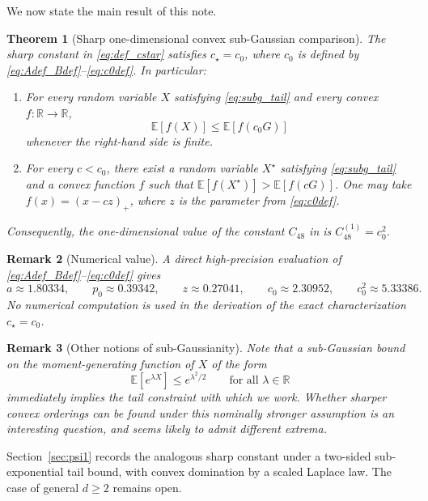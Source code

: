 \documentclass[11pt]{article}
\newcommand{\R}{\mathbb{R}}
\newcommand{\Ebb}{\mathbb{E}}
\newtheorem{theorem}{Theorem}
\newtheorem{remark}[theorem]{Remark}
\begin{document}
We now state the main result of this note.
\begin{theorem}[Sharp one-dimensional convex sub-Gaussian comparison]
\label{thm:main}
The sharp constant in \eqref{eq:def_cstar} satisfies $c_\star = c_0$, where $c_0$ is defined by \eqref{eq:Adef_Bdef}--\eqref{eq:c0def}. In particular:
\begin{enumerate}
\item For every random variable $X$ satisfying \eqref{eq:subg_tail} and every convex $f:\R\to\R$,
%
\begin{equation}
\label{eq:main_conv_dom}
\Ebb[f(X)] \le \Ebb[f(c_0G)]
\end{equation}
%
whenever the right-hand side is finite.
\item For every $c<c_0$, there exist a random variable $X^\star$ satisfying \eqref{eq:subg_tail} and a convex
function $f$ such that $\Ebb[f(X^\star)] > \Ebb[f(cG)]$.
One may take $f(x) = (x-cz)_+$, where $z$ is the parameter from \eqref{eq:c0def}.
\end{enumerate}
Consequently, the one-dimensional value of the constant $C_{48}$ in \cite{optimization-constants-repo} is $C_{48}^{(1)} = c_0^2$.
\end{theorem}

\begin{remark}[Numerical value]
A direct high-precision evaluation of \eqref{eq:Adef_Bdef}--\eqref{eq:c0def} gives
%
\[
a \approx 1.80334,\qquad
p_0 \approx 0.39342,\qquad
z \approx 0.27041,\qquad
c_0 \approx 2.30952,\qquad
c_0^2 \approx 5.33386.
\]
%
No numerical computation is used in the derivation of the exact characterization $c_\star=c_0$.
\end{remark}

\begin{remark}[Other notions of sub-Gaussianity]
    Note that a sub-Gaussian bound on the moment-generating function of $X$ of the form
    \begin{equation*}
        \mathbb{E} [ e^{\lambda X}] \leq e^{\lambda^2 / 2} \qquad \text{for all } \lambda \in \mathbb{R}
    \end{equation*}
    immediately implies the tail constraint with which we work. Whether sharper convex orderings can be found under this nominally stronger assumption is an interesting question, and seems likely to admit different extrema.
\end{remark}

Section~\ref{sec:psi1} records the analogous sharp constant under a two-sided sub-exponential tail bound, with convex domination by a scaled Laplace law. The case of general $d \geq 2$ remains open.
\end{document}

